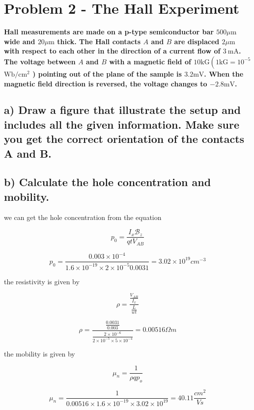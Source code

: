 \section{Problem 2 - The Hall Experiment}

\textbf{Hall measurements are made on a p-type semiconductor bar \( 500 \mu \mathrm{m} \) wide and \( 20 \mu \mathrm{m} \) thick. The Hall contacts \( A \) and \( B \) are displaced \( 2 \mu \mathrm{m} \) with respect to each other in the direction of a current flow of \( 3 \mathrm{~mA} \). The voltage between \( A \) and \( B \) with a magnetic field of \( 10 \mathrm{kG}\left(1 \mathrm{kG}=10^{-5}\right. \) \( \mathrm{Wb} / \mathrm{cm}^{2} \) ) pointing out of the plane of the sample is \( 3.2 \mathrm{mV} \). When the magnetic field direction is reversed, the voltage changes to \( -2.8 \mathrm{mV} \).}


\subsection*{a) Draw a figure that illustrate the setup and includes all the given information. Make sure
you get the correct orientation of the contacts A and B.}

\subsection*{b) Calculate the hole concentration and mobility.}

we can get the hole concentration from the equation

\begin{equation*}
    p_0=\frac{I_x\mathscr{B}_{z} }{qtV_{AB}}
\end{equation*}

\begin{equation*}
    p_0=\frac{0.003\times10^{-4} }{1.6\times 10^{-19}\times 2\times 10^{-5} 0.0031}=3.02\times10^{19} cm^{-3}
\end{equation*}

the resistivity is given by

\begin{equation*}
    \rho=\frac{\frac{V_{AB}}{I_x}}{\frac{L}{wt}}
\end{equation*}

\begin{equation*}
    \rho=\frac{\frac{0.0031}{0.003}}{\frac{2\times 10^{-6}}{2\times 10^{-5}\times 5\times10^{-4}}}=0.00516
    \Omega m
\end{equation*}

the mobility is given by 

\begin{equation*}
    \mu_n=\frac{1}{\rho q p_o}
\end{equation*}

\begin{equation*}
    \mu_n=\frac{1}{0.00516\times 1.6\times 10^{-19}\times 3.02\times10^{19} }=40.11\frac{cm^2}{Vs}
\end{equation*}